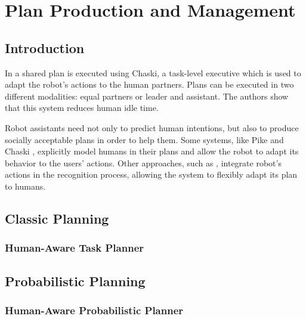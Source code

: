 
\chapter{Plan Production and Management} %

\label{chapter-plan production and management} %



\section{Introduction}


In \cite{shah2011improved} a shared plan is executed
using Chaski, a task-level executive which is used to adapt the robot's actions to
the human partners. Plans can be executed in two different modalities:
equal partners or leader and assistant. The authors show that this
system reduces human idle time.


Robot assistants need not only to predict human intentions, but also to produce socially acceptable plans in order to help them. Some systems, like Pike \cite{karpas2015robust} and Chaski \cite{shah2011improved}, explicitly model humans in their plans and allow the robot to adapt its behavior to the users' actions.  Other approaches, such as \cite{levine2014concurrent}, integrate robot's actions in the recognition process, allowing the system to flexibly adapt its plan to humans. 

\section{Classic Planning}
\subsection{Human-Aware Task Planner}

\section{Probabilistic Planning}
\subsection{Human-Aware Probabilistic Planner}
